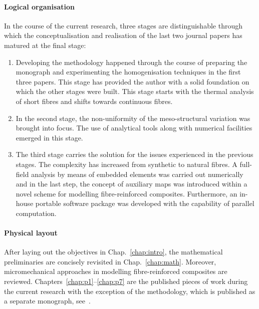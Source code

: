 	\paragraph{Logical organisation} In the course of the current research, three stages are distinguishable through which the conceptualisation and realisation of the last two journal papers has matured at the final stage:
	\begin{enumerate}[label=\Roman*.]
	\item Developing the methodology happened through the course of preparing the monograph and experimenting the homogenisation techniques in the first three papers. This stage has provided the author with a solid foundation on which the other stages were built. This stage starts with the thermal analysis of short fibres and shifts towards continuous fibres.
	\item In the second stage, the non-uniformity of the meso-structural variation was brought into focus. The use of analytical tools along with numerical facilities emerged in this stage.
	\item The third stage carries the solution for the issues experienced in the previous stages. The complexity has increased from synthetic to natural fibres. A full-field analysis by means of embedded elements was carried out numerically and in the last step, the concept of auxiliary maps was introduced within a novel scheme for modelling fibre-reinforced composites. Furthermore, an in-house portable software package was developed with the capability of parallel computation.
	\end{enumerate} 

	\paragraph{Physical layout} After laying out the objectives in Chap.~\ref{chap:intro}, the mathematical preliminaries are concisely revisited in Chap.~\ref{chap:math}. Moreover, micromechanical approaches in modelling fibre-reinforced composites are reviewed. Chapters~\ref{chap:p1}--\ref{chap:p7} are the published pieces of work during the current research with the exception of the methodology, which is published as a separate monograph, see~\parencite{Javanbakht.2017}. 
	
